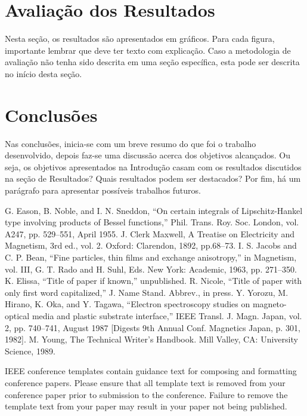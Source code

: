 \documentclass[conference]{IEEEtran}
\begin{document}
\section{Avaliação dos Resultados}

Nesta seção, os resultados são apresentados em gráficos. Para cada figura,
importante lembrar que deve ter texto com explicação.
Caso a metodologia de avaliação não tenha sido descrita em uma seção específica,
esta pode ser descrita no início desta seção.

\section{Conclusões}

Nas conclusões, inicia-se com um breve resumo do que foi o trabalho desenvolvido,
depois faz-se uma discussão acerca dos objetivos alcançados. Ou seja, os objetivos
apresentados na Introdução casam com os resultados discutidos na seção de Resultados? 
Quais resultados podem ser destacados? Por fim, há um parágrafo para apresentar possíveis trabalhos futuros.

\begin{thebibliography}{00}
 G. Eason, B. Noble, and I. N. Sneddon, ``On certain integrals of Lipschitz-Hankel type involving products of Bessel functions,'' Phil. Trans. Roy. Soc. London, vol. A247, pp. 529--551, April 1955.
 J. Clerk Maxwell, A Treatise on Electricity and Magnetism, 3rd ed., vol. 2. Oxford: Clarendon, 1892, pp.68--73.
 I. S. Jacobs and C. P. Bean, ``Fine particles, thin films and exchange anisotropy,'' in Magnetism, vol. III, G. T. Rado and H. Suhl, Eds. New York: Academic, 1963, pp. 271--350.
 K. Elissa, ``Title of paper if known,'' unpublished.
 R. Nicole, ``Title of paper with only first word capitalized,'' J. Name Stand. Abbrev., in press.
 Y. Yorozu, M. Hirano, K. Oka, and Y. Tagawa, ``Electron spectroscopy studies on magneto-optical media and plastic substrate interface,'' IEEE Transl. J. Magn. Japan, vol. 2, pp. 740--741, August 1987 [Digests 9th Annual Conf. Magnetics Japan, p. 301, 1982].
 M. Young, The Technical Writer's Handbook. Mill Valley, CA: University Science, 1989.
\end{thebibliography}
\vspace{12pt}
\color{red}
IEEE conference templates contain guidance text for composing and formatting conference papers. Please ensure that all template text is removed from your conference paper prior to submission to the conference. Failure to remove the template text from your paper may result in your paper not being published.
\end{document}
